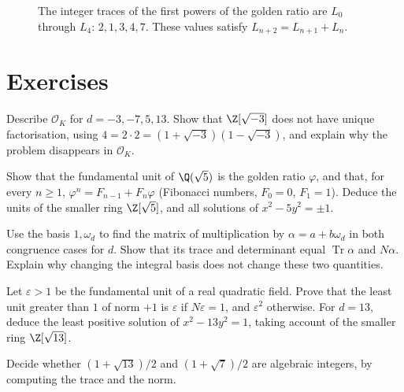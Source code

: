 \begin{figure}[ht]
\centering
{}
\caption{The integer traces of the first powers of the golden ratio are $L_0$ through $L_4$: $2,1,3,4,7$. These values satisfy $L_{n+2}=L_{n+1}+L_n$.}
\label{fig:v13-extra-01-b}
\end{figure}

\section{Exercises}

\begin{exercise}[$\star$]\label{ex:ringint}
Describe $\mathcal O_K$ for $d=-3,-7,5,13$. Show that $\Z[\sqrt{-3}]$ does not have unique factorisation, using $4=2\cdot2=(1+\sqrt{-3})(1-\sqrt{-3})$, and explain why the problem disappears in $\mathcal O_K$.
\end{exercise}

\begin{exercise}[$\star\star$]\label{ex:goldenunit}
Show that the fundamental unit of $\Q(\sqrt5)$ is the golden ratio $\varphi$, and that, for every $n\ge1$, $\varphi^n=F_{n-1}+F_n\varphi$ (Fibonacci numbers, $F_0=0$, $F_1=1$). Deduce the units of the smaller ring $\Z[\sqrt5]$, and all solutions of $x^2-5y^2=\pm1$.
\end{exercise}

\begin{exercise}[$\star\star$]\label{ex:t1-norm-matrix}
Use the basis $1,\omega_d$ to find the matrix of multiplication by
$\alpha=a+b\omega_d$ in both congruence cases for $d$.
Show that its trace and determinant equal $\operatorname{Tr}\alpha$
and $N\alpha$. Explain why changing the integral basis does not change
these two quantities.
\end{exercise}

\begin{exercise}[$\star\star$]\label{ex:t1-unit-sign}
Let $\varepsilon>1$ be the fundamental unit of a real quadratic field.
Prove that the least unit greater than $1$ of norm $+1$ is
$\varepsilon$ if $N\varepsilon=1$, and $\varepsilon^2$ otherwise.
For $d=13$, deduce the least positive solution of $x^2-13y^2=1$,
taking account of the smaller ring $\Z[\sqrt{13}]$.
\end{exercise}

\begin{exercise}[$\star$]\label{ex:t1-half}
Decide whether $(1+\sqrt{13})/2$ and $(1+\sqrt{7})/2$ are algebraic integers, by computing the trace and the norm.
\end{exercise}

